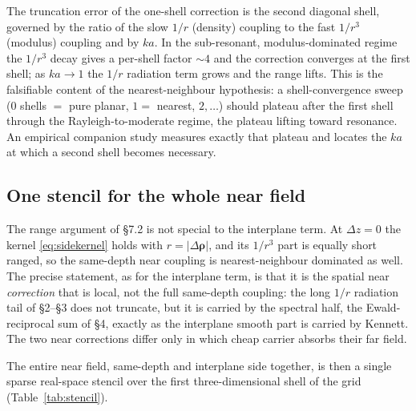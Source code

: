 \documentclass[11pt,a4paper]{article}
\newcommand{\brho}{\boldsymbol{\rho}}
\begin{document}
The truncation error of the one-shell correction is the second diagonal shell, governed by the
ratio of the slow $1/r$ (density) coupling to the fast $1/r^{3}$ (modulus) coupling and by
$ka$. In the sub-resonant, modulus-dominated regime the $1/r^{3}$ decay gives a per-shell
factor $\sim 4$ and the correction converges at the first shell; as $ka\to 1$ the $1/r$
radiation term grows and the range lifts. This is the falsifiable content of the
nearest-neighbour hypothesis: a shell-convergence sweep ($0$ shells $=$ pure planar, $1=$
nearest, $2,\dots$) should plateau after the first shell through the Rayleigh-to-moderate
regime, the plateau lifting toward resonance. An empirical companion study measures exactly
that plateau and locates the $ka$ at which a second shell becomes necessary.

\subsection{One stencil for the whole near field}

The range argument of \S7.2 is not special to the interplane term. At $\Delta z=0$ the kernel
\eqref{eq:sidekernel} holds with $r=|\Delta\brho|$, and its $1/r^{3}$ part is equally short
ranged, so the same-depth near coupling is nearest-neighbour dominated as well. The precise
statement, as for the interplane term, is that it is the spatial near \emph{correction} that is
local, not the full same-depth coupling: the long $1/r$ radiation tail of \S2--\S3 does not
truncate, but it is carried by the spectral half, the Ewald-reciprocal sum of \S4, exactly as
the interplane smooth part is carried by Kennett. The two near corrections differ only in which
cheap carrier absorbs their far field.

The entire near field, same-depth and interplane side together, is then a single sparse
real-space stencil over the first three-dimensional shell of the grid (Table~\ref{tab:stencil}).
\end{document}
